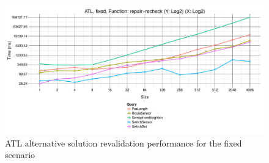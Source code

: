 \documentclass[submission,copyright,creativecommons]{eptcs}
\begin{document}
\begin{figure}[ht]
\centerline{
\includegraphics[width=15cm]{figures/fixed-ATL-GroupBy-Query-time-revalidation-alt}}
\caption{ATL alternative solution revalidation performance for the fixed scenario}
\label{fig:atl-recheck-performance-alt}
\end{figure}




\end{document}
